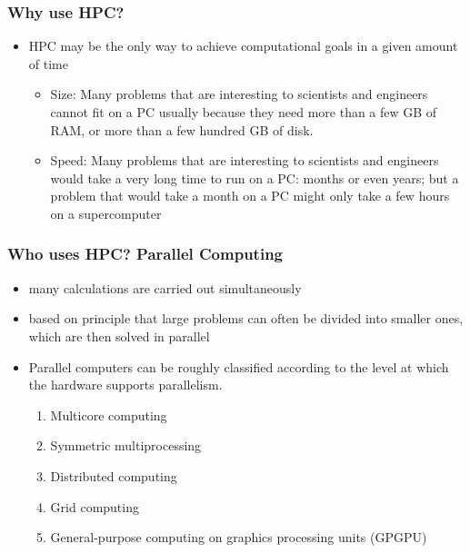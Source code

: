 \documentclass[slidestop,mathserif,compress,xcolor=svgnames,table]{beamer}
\begin{document}
\begin{frame}
  \frametitle{\small Why use HPC?}
  \begin{itemize}
    \item HPC may be the only way to achieve computational goals in a given amount of time
    \begin{itemize}
      \item Size: Many problems that are interesting to scientists and engineers cannot fit on a PC usually because they need more than a few GB of RAM, or more than a few hundred GB of disk.
      \item Speed: Many problems that are interesting to scientists and engineers would take a very long time to run on a PC: months or even years; but a problem that would take a month on a PC might only take a few hours on a supercomputer
    \end{itemize}
  \end{itemize}
\end{frame}

\begin{frame}
  \frametitle{\small Who uses HPC? Parallel Computing}
  \begin{itemize}
    \item many calculations are carried out simultaneously
    \item based on principle that large problems can often be divided into smaller ones, which are then solved in parallel
    \item Parallel computers can be roughly classified according to the level at which the hardware supports parallelism.
    \begin{enumerate}
      \item Multicore computing
      \item Symmetric multiprocessing
      \item Distributed computing
      \item Grid computing
      \item General-purpose computing on graphics processing units (GPGPU)
    \end{enumerate}
  \end{itemize}
\end{frame}
\end{document}
